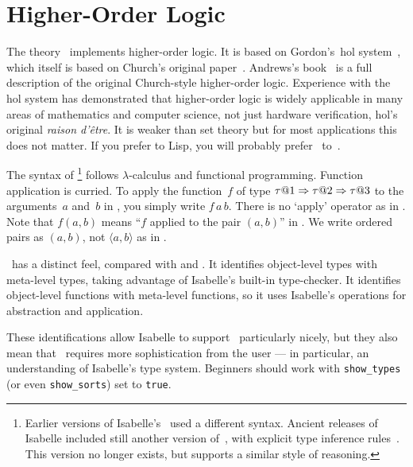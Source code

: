 \chapter{Higher-Order Logic}

The theory~ implements higher-order logic.  It is based on
Gordon's~{\sc hol} system~\cite{mgordon-hol}, which itself is based on
Church's original paper~\cite{church40}.  Andrews's
book~\cite{andrews86} is a full description of the original
Church-style higher-order logic.  Experience with the {\sc hol} system
has demonstrated that higher-order logic is widely applicable in many
areas of mathematics and computer science, not just hardware
verification, {\sc hol}'s original \textit{raison d'{\^e}tre\/}.  It is
weaker than {\ZF} set theory but for most applications this does not
matter.  If you prefer {\ML} to Lisp, you will probably prefer \HOL\ 
to~{\ZF}.

The syntax of \HOL\footnote{Earlier versions of Isabelle's \HOL\ used a
different syntax.  Ancient releases of Isabelle included still another version
of~\HOL, with explicit type inference rules~\cite{paulson-COLOG}.  This
version no longer exists, but \thydx{ZF} supports a similar style of
reasoning.} follows $\lambda$-calculus and functional programming.  Function
application is curried.  To apply the function~$f$ of type
$\tau@1\To\tau@2\To\tau@3$ to the arguments~$a$ and~$b$ in \HOL, you simply
write $f\,a\,b$.  There is no `apply' operator as in \thydx{ZF}.  Note that
$f(a,b)$ means ``$f$ applied to the pair $(a,b)$'' in \HOL.  We write ordered
pairs as $(a,b)$, not $\langle a,b\rangle$ as in {\ZF}.

\HOL\ has a distinct feel, compared with {\ZF} and {\CTT}.  It
identifies object-level types with meta-level types, taking advantage of
Isabelle's built-in type-checker.  It identifies object-level functions
with meta-level functions, so it uses Isabelle's operations for abstraction
and application.

These identifications allow Isabelle to support \HOL\ particularly
nicely, but they also mean that \HOL\ requires more sophistication
from the user --- in particular, an understanding of Isabelle's type
system.  Beginners should work with \texttt{show_types} (or even
\texttt{show_sorts}) set to \texttt{true}.


